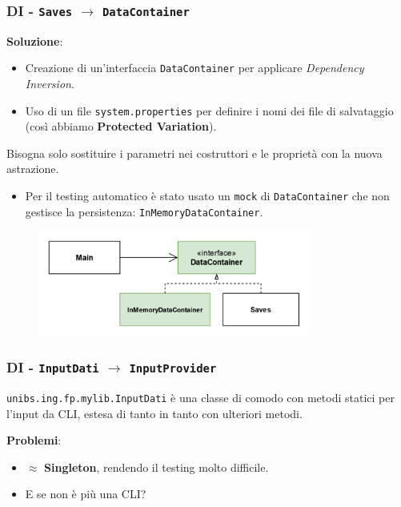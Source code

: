 \begin{frame}
    \frametitle{DI - \texttt{Saves} $\to$ \texttt{DataContainer}}
    \textbf{Soluzione}:
    \begin{itemize}
        \item Creazione di un'interfaccia \texttt{DataContainer} per applicare \emph{Dependency Inversion}.
        \item Uso di un file \texttt{system.properties} per definire i nomi dei file di salvataggio
        (così abbiamo \textbf{Protected Variation}).
    \end{itemize}
    Bisogna solo sostituire i parametri nei costruttori e le proprietà con la nuova astrazione.
    \begin{itemize}
        \item Per il testing automatico è stato usato un \texttt{mock} di \texttt{DataContainer} che non gestisce
        la persistenza: \texttt{InMemoryDataContainer}.
    \end{itemize}
    \begin{figure}
        \includegraphics[width=0.8\textwidth]{img/dependencyInversion_after.png}
    \end{figure}
\end{frame}

\begin{frame}
    \frametitle{DI - \texttt{InputDati} $\to$ \texttt{InputProvider}}
    \texttt{unibs.ing.fp.mylib.InputDati} è una classe di comodo con metodi statici per l'input
    da CLI, estesa di tanto in tanto con ulteriori metodi.

    \textbf{Problemi}:
    \begin{itemize}
        \item {\color{red}$\approx$ \textbf{Singleton}}, rendendo il testing molto difficile.
        \item E se non è più una CLI?
    \end{itemize}
\end{frame}

